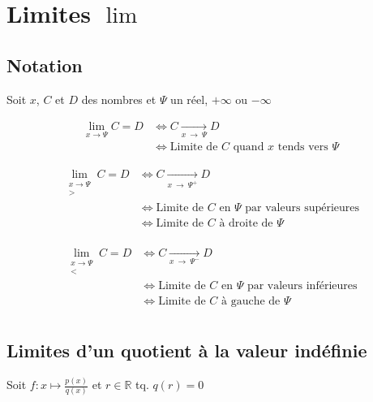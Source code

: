 \documentclass{article}
\newcommand{\R}{\mathds{R}}
\newcommand{\oo}{\infty}
\newcommand{\goesto}[2]{\xrightarrow[#1\:\to\:#2]{}}
\begin{document}
\newpage\section{Limites $\lim$}

\subsection{Notation}

Soit $x$, $C$ et $D$ des nombres et $\Psi$ un réel, $+\oo$ ou $-\oo$

\begin{equation*}
    \begin{split}
        \lim_{x \to \Psi} C = D &\iff C \goesto{x}{\Psi} D \\
        &\iff \text{Limite de $C$ quand $x$ tends vers $\Psi$}
    \end{split}
\end{equation*}

\begin{equation*}
    \begin{split}
        \lim_{\substack{x\to\Psi \\ >}} C = D &\iff C \goesto{x}{\Psi^+} D \\
        &\iff \text{Limite de $C$ en $\Psi$ par valeurs supérieures} \\
        &\iff \text{Limite de $C$ à droite de $\Psi$} \\
    \end{split}
\end{equation*}

\begin{equation*}
    \begin{split}
         \lim_{\substack{x\to\Psi \\ <}} C = D &\iff C \goesto{x}{\Psi^-} D\\
        &\iff \text{Limite de $C$ en $\Psi$ par valeurs inférieures} \\
        &\iff \text{Limite de $C$ à gauche de $\Psi$} \\
    \end{split}
\end{equation*}

\subsection{Limites d'un quotient à la valeur indéfinie}

Soit $f:x\mapsto\frac{p(x)}{q(x)}$ et $r \in \R$ tq. $q(r) = 0$
\end{document}
